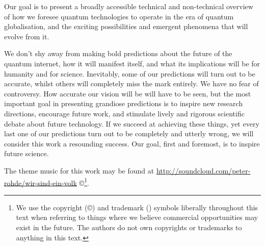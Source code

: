 Our goal is to present a broadly accessible technical and non-technical overview of how we foresee quantum technologies to operate in the era of quantum globalisation, and the exciting possibilities and emergent phenomena that will evolve from it.

We don't shy away from making bold predictions about the future of the quantum internet, how it will manifest itself, and what its implications will be for humanity and for science. Inevitably, some of our predictions will turn out to be accurate, whilst others will completely miss the mark entirely. We have no fear of controversy. How accurate our vision will be will have to be seen, but the most important goal in presenting grandiose predictions is to inspire new research directions, encourage future work, and stimulate lively and rigorous scientific debate about future technology. If we succeed at achieving these things, yet every last one of our predictions turn out to be completely and utterly wrong, we will consider this work a resounding success. Our goal, first and foremost, is to inspire future science.

\seriousmode
The theme music for this work may be found at \url{http://soundcloud.com/peter-rohde/wir-sind-ein-volk} \copyright{}\footnote{We use the copyright (\copyright) and trademark (\texttrademark) symbols liberally throughout this text when referring to things where we believe commercial opportunities may exist in the future. The authors do not own copyrights or trademarks to anything in this text.}.
\fi
